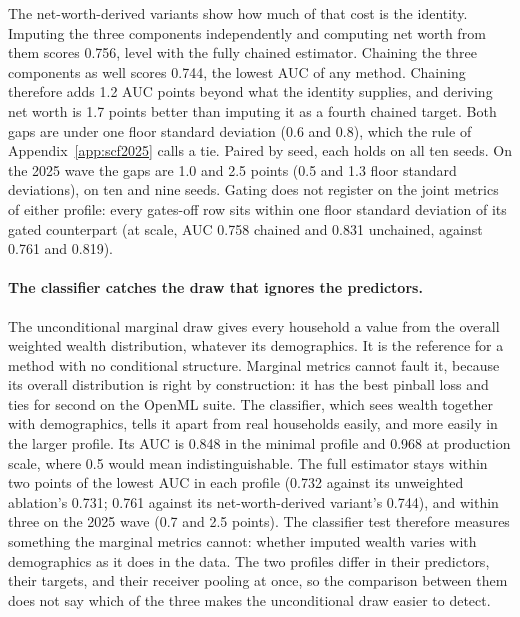 The net-worth-derived variants show how much of that cost is the identity.
Imputing the three components independently and computing net
worth from them scores 0.756, level with the fully chained estimator.
Chaining the three components as well scores 0.744, the lowest AUC of any
method. Chaining therefore adds 1.2 AUC points beyond what the identity
supplies, and deriving net worth is 1.7 points better than imputing it as a
fourth chained target. Both gaps are under one floor standard deviation
(0.6 and 0.8), which the rule of Appendix~\ref{app:scf2025} calls a tie.
Paired by seed, each holds on all ten seeds. On the 2025 wave the gaps are
1.0 and 2.5 points (0.5 and 1.3 floor standard deviations), on ten and nine
seeds. Gating does not register on the joint metrics of
either profile: every gates-off row sits within one floor standard
deviation of its gated counterpart (at scale, AUC 0.758 chained and 0.831
unchained, against 0.761 and 0.819).

\paragraph{The classifier catches the draw that ignores the predictors.}
The unconditional marginal draw gives every household a value from the
overall weighted wealth distribution, whatever its demographics. It is the
reference for a method with no conditional structure. Marginal metrics
cannot fault it, because its overall distribution is right by construction:
it has the best \scf{} pinball loss and ties for second on the OpenML
suite. The classifier, which sees wealth together with demographics, tells
it apart from real households easily, and more easily in the larger profile.
Its AUC is 0.848 in the minimal profile and 0.968 at production scale, where
0.5 would mean indistinguishable. The full estimator stays within two points
of the lowest AUC in each profile (0.732 against its unweighted ablation's
0.731; 0.761 against its net-worth-derived variant's 0.744), and within
three on the 2025 wave (0.7 and 2.5 points). The classifier test therefore
measures something the marginal metrics cannot: whether imputed wealth
varies with demographics as it does in the data. The two profiles differ in
their predictors, their targets, and their receiver pooling at once, so the
comparison between them does not say which of the three makes the
unconditional draw easier to detect.

